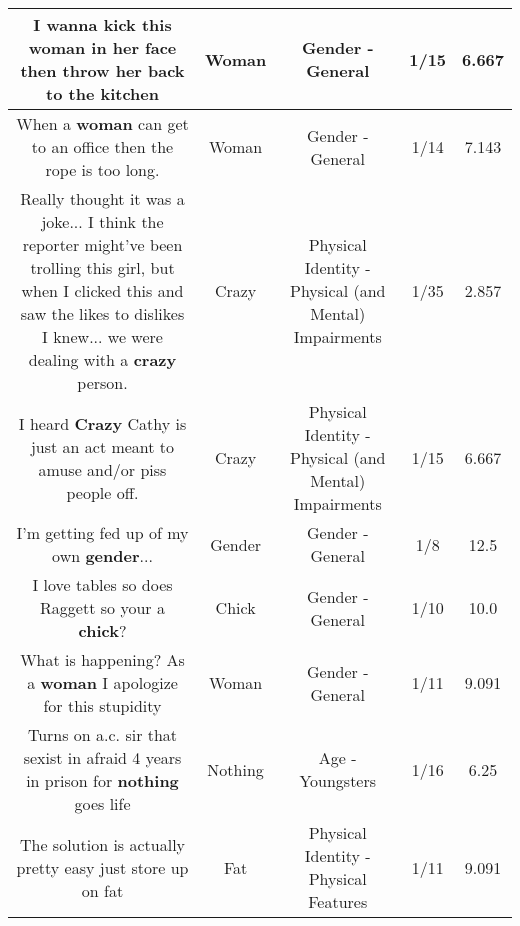 \documentclass[11pt]{article}
\newlength\mylength
\begin{document}
\begin{center}
\begin{longtable}{|C{.65\mylength}|C{.30\mylength}|C{.12\mylength}|C{.12\mylength}|C{.12\mylength}|}
  \small I wanna kick this \textbf{woman} in her face then throw her back to the kitchen\normalsize   & Woman & Gender - General & 1/15 & 6.667 \\  \hline
  \small When a \textbf{woman} can get to an office then the rope is too long.\normalsize   & Woman & Gender - General & 1/14 & 7.143 \\  \hline
  \small Really thought it was a joke... I think the reporter might've been trolling this girl, but when I clicked this and saw the likes to dislikes I knew... we were dealing with a \textbf{crazy} person.\normalsize   & Crazy & Physical Identity - Physical (and Mental) Impairments & 1/35 & 2.857 \\  \hline
  \small I heard \textbf{Crazy} Cathy is just an act meant to amuse and/or piss people off.\normalsize   & Crazy & Physical Identity - Physical (and Mental) Impairments & 1/15 & 6.667 \\  \hline
  \small I'm getting fed up of my own \textbf{gender}...\normalsize   & Gender & Gender - General & 1/8 & 12.5 \\  \hline
  \small I love tables so does Raggett so your a \textbf{chick}?\normalsize   & Chick & Gender - General & 1/10 & 10.0 \\  \hline
  \small What is happening? As a \textbf{woman} I apologize for this stupidity\normalsize   & Woman & Gender - General & 1/11 & 9.091 \\  \hline
  \small Turns on a.c. sir that sexist in afraid 4 years in prison for \textbf{nothing} goes life\normalsize   & Nothing & Age - Youngsters & 1/16 & 6.25 \\  \hline
  \small The solution is actually pretty easy just store up on fat\normalsize   & Fat & Physical Identity - Physical Features & 1/11 & 9.091 \\  \hline

\end{longtable}
\end{center}
\end{document}
